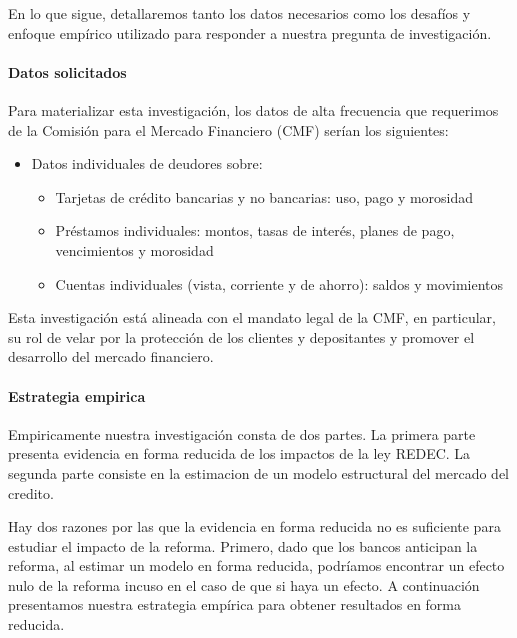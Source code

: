 \documentclass[11pt]{article}
\theoremstyle{plain}
\theoremstyle{plain}
\begin{document}
 





En lo que sigue, detallaremos tanto los datos necesarios como los desafíos y enfoque empírico utilizado para responder a nuestra pregunta de investigación.

\newpage





 

\paragraph{Datos solicitados}


Para materializar esta investigación, 
los datos de alta frecuencia que requerimos de la Comisión para el Mercado Financiero (CMF) serían los siguientes:


\begin{itemize}
    \item Datos individuales de deudores sobre:
    \begin{itemize}
        \item Tarjetas de crédito bancarias y no bancarias: uso, pago y morosidad
        \item Préstamos individuales: montos, tasas de interés, planes de pago, vencimientos y morosidad
        \item Cuentas individuales (vista, corriente y de ahorro): saldos y movimientos
    \end{itemize}
\end{itemize}


Esta investigación está alineada con el mandato legal de la CMF, en particular, su rol de velar por la protección de los clientes y depositantes y promover el desarrollo del mercado financiero. 


 

\paragraph{Estrategia empirica}
  
Empiricamente nuestra investigación consta de dos partes. La primera parte presenta evidencia en forma reducida de los impactos de la ley REDEC. La segunda parte consiste en la estimacion de un modelo estructural del mercado del credito. 

Hay dos razones por las que la evidencia en forma reducida no es suficiente para estudiar el impacto de la reforma. Primero,  dado que los bancos anticipan la reforma, al estimar un modelo en forma reducida, podríamos encontrar un efecto nulo  de la reforma incuso en el caso de que si haya un efecto. A continuación presentamos nuestra estrategia empírica para obtener resultados en forma reducida. %
\end{document}
